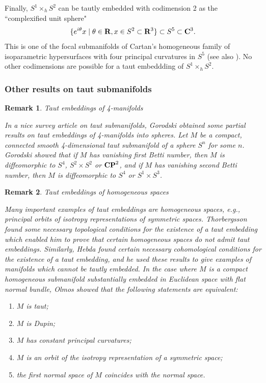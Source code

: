 \documentclass[12pt]{article}
\newtheorem{remark}{Remark}[section]
\begin{document}
{Finally, $S^1 \times_h S^2$ can be tautly embedded with codimension 2 as the
``complexified unit sphere"
\begin{equation}
\label{eq:complexified-unit-sphere}
\{e^{i\theta} x \mid \theta \in {\bf R}, x \in S^2 \subset {\bf R}^3\}
\subset S^5 \subset {\bf C}^3.
\end{equation}
This is one of the focal submanifolds of Cartan's \cite{Car4} homogeneous family
of isoparametric hypersurfaces with four principal curvatures
in $S^5$ (see also \cite[pp. 155--159]{CR8}).
No other codimensions are possible for
a taut embeddding of $S^1 \times_h S^2$.

\subsubsection*{Other results on taut submanifolds}


\begin{remark}{Taut embeddings of 4-manifolds}
\label{rem:taut-4-man}

\noindent
{\rm In a nice survey article on taut submanifolds, Gorodski \cite{Gorodski-06} 
obtained some partial results on taut embeddings of 4-manifolds into spheres.  Let $M$ be a compact, connected smooth 4-dimensional taut
submanifold of a sphere $S^n$ for some $n$.  Gorodski showed that if $M$ has vanishing first Betti number, then $M$ is diffeomorphic to $S^4$, $S^2 \times S^2$ or ${\bf CP}^2$, and if
$M$ has vanishing second Betti number, then $M$ is diffeomorphic to $S^4$ or $S^1 \times S^3$.}
\end{remark}



\begin{remark}{Taut embeddings of homogeneous spaces}
\label{rem:taut-homog-spaces}

\noindent
{\rm Many important examples of taut embeddings are homogeneous
spaces, e.g., principal orbits of isotropy representations of symmetric spaces.  Thorbergsson \cite{Th5}
found some necessary topological conditions for the existence of a taut
embedding which enabled him to prove that certain homogeneous
spaces do not admit taut embeddings.  Similarly, Hebda
\cite{Heb3} found certain necessary cohomological conditions
for the existence of a taut embedding, and he used
these results to give examples of manifolds which cannot be tautly
embedded. In the case where $M$ is a compact homogeneous
submanifold substantially embedded in Euclidean space
with flat normal bundle, 
Olmos \cite{Olm1} showed that the following statements are
equivalent:} 
\begin{enumerate}
\item[${\rm(a)}$] $M$ is taut; 
\item[${\rm(b)}$] $M$ is Dupin;
\item[${\rm(c)}$] $M$ has constant principal curvatures;
\item[${\rm(d)}$] $M$ is an orbit of the isotropy representation of a symmetric space;
\item[${\rm(e)}$] the first normal space of $M$ coincides with the normal space.
\end{enumerate}
\end{remark}



}
\end{document}

